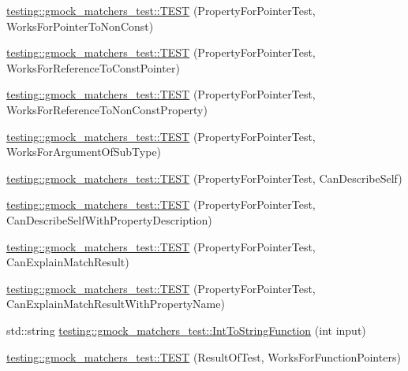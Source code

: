 \begin{DoxyCompactItemize}
\item 
\mbox{\hyperlink{namespacetesting_1_1gmock__matchers__test_acc639f3cbeacf4af712bf02ac451b160}{testing\+::gmock\+\_\+matchers\+\_\+test\+::\+T\+E\+ST}} (Property\+For\+Pointer\+Test, Works\+For\+Pointer\+To\+Non\+Const)
\item 
\mbox{\hyperlink{namespacetesting_1_1gmock__matchers__test_a028687dfb04ec008ea129f9cc95aac62}{testing\+::gmock\+\_\+matchers\+\_\+test\+::\+T\+E\+ST}} (Property\+For\+Pointer\+Test, Works\+For\+Reference\+To\+Const\+Pointer)
\item 
\mbox{\hyperlink{namespacetesting_1_1gmock__matchers__test_a78762b60c9d0c985916b698e6d4c55e3}{testing\+::gmock\+\_\+matchers\+\_\+test\+::\+T\+E\+ST}} (Property\+For\+Pointer\+Test, Works\+For\+Reference\+To\+Non\+Const\+Property)
\item 
\mbox{\hyperlink{namespacetesting_1_1gmock__matchers__test_a4c2f4b483550e2e70b09eea3836b83e0}{testing\+::gmock\+\_\+matchers\+\_\+test\+::\+T\+E\+ST}} (Property\+For\+Pointer\+Test, Works\+For\+Argument\+Of\+Sub\+Type)
\item 
\mbox{\hyperlink{namespacetesting_1_1gmock__matchers__test_a064fc5dd5ca0106e8ed0fbc483472186}{testing\+::gmock\+\_\+matchers\+\_\+test\+::\+T\+E\+ST}} (Property\+For\+Pointer\+Test, Can\+Describe\+Self)
\item 
\mbox{\hyperlink{namespacetesting_1_1gmock__matchers__test_a8c0578e07cfe031fa9de3ed3e5bde34a}{testing\+::gmock\+\_\+matchers\+\_\+test\+::\+T\+E\+ST}} (Property\+For\+Pointer\+Test, Can\+Describe\+Self\+With\+Property\+Description)
\item 
\mbox{\hyperlink{namespacetesting_1_1gmock__matchers__test_a1a7e2a9641a06e492d58c75d900330d3}{testing\+::gmock\+\_\+matchers\+\_\+test\+::\+T\+E\+ST}} (Property\+For\+Pointer\+Test, Can\+Explain\+Match\+Result)
\item 
\mbox{\hyperlink{namespacetesting_1_1gmock__matchers__test_a09471d531d0bbeaca60cb850dfe6f33e}{testing\+::gmock\+\_\+matchers\+\_\+test\+::\+T\+E\+ST}} (Property\+For\+Pointer\+Test, Can\+Explain\+Match\+Result\+With\+Property\+Name)
\item 
std\+::string \mbox{\hyperlink{namespacetesting_1_1gmock__matchers__test_a94cad49187e6a3cc41d3ea59903214cf}{testing\+::gmock\+\_\+matchers\+\_\+test\+::\+Int\+To\+String\+Function}} (int input)
\item 
\mbox{\hyperlink{namespacetesting_1_1gmock__matchers__test_a5aea17c7d3dd74cbc0cbf181b3a9e5f8}{testing\+::gmock\+\_\+matchers\+\_\+test\+::\+T\+E\+ST}} (Result\+Of\+Test, Works\+For\+Function\+Pointers)

\end{DoxyCompactItemize}
